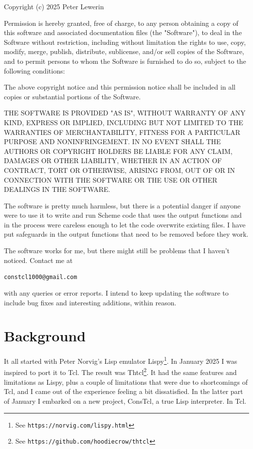 \documentclass[a5paper,final]{memoir}
\begin{document}
Copyright (c) 2025 Peter Lewerin

Permission is hereby granted, free of charge, to any person obtaining a copy
of this software and associated documentation files (the "Software"), to deal
in the Software without restriction, including without limitation the rights
to use, copy, modify, merge, publish, distribute, sublicense, and/or sell
copies of the Software, and to permit persons to whom the Software is
furnished to do so, subject to the following conditions:

The above copyright notice and this permission notice shall be included in all
copies or substantial portions of the Software.

THE SOFTWARE IS PROVIDED "AS IS", WITHOUT WARRANTY OF ANY KIND, EXPRESS OR
IMPLIED, INCLUDING BUT NOT LIMITED TO THE WARRANTIES OF MERCHANTABILITY,
FITNESS FOR A PARTICULAR PURPOSE AND NONINFRINGEMENT\@. IN NO EVENT SHALL THE
AUTHORS OR COPYRIGHT HOLDERS BE LIABLE FOR ANY CLAIM, DAMAGES OR OTHER
LIABILITY, WHETHER IN AN ACTION OF CONTRACT, TORT OR OTHERWISE, ARISING FROM,
OUT OF OR IN CONNECTION WITH THE SOFTWARE OR THE USE OR OTHER DEALINGS IN THE
SOFTWARE.

The software is pretty much harmless, but there is a potential danger if anyone
were to use it to write and run Scheme code that uses the output functions and
in the process were careless enough to let the code overwrite existing files. I
have put safeguards in the output functions that need to be removed before they
work.

The software works for me, but there might still be problems that I haven't
noticed. Contact me at

\indent \texttt{constcl1000@gmail.com}

with any queries or error reports. I intend to keep updating the software to
include bug fixes and interesting additions, within reason.

\section*{Background}
\label{background}

It all started with Peter Norvig's Lisp emulator
Lispy\footnote{See \texttt{https://norvig.com/lispy.html}}. In January 2025 I
was inspired to port it to Tcl. The result was Thtcl\footnote{See
\texttt{https://github.com/hoodiecrow/thtcl}}. It had the same features and
limitations as Lispy, plus a couple of limitations that were due to
shortcomings of Tcl, and I came out of the experience feeling a bit
dissatisfied. In the latter part of January I embarked on a new project,
ConsTcl, a true Lisp interpreter. In Tcl.
\end{document}
